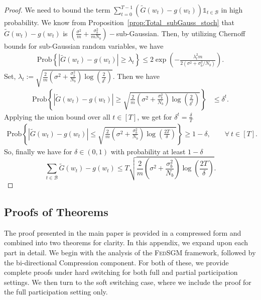 \documentclass{article} %
\def\B{{\mathcal B}}
\begin{document}
\begin{proof}
    We need to bound the term $\sum_{t=0}^{T-1}(\tilde{G}(w_t) - g(w_t))\mathds{1}_{t \in \B}$ in high probability. We know from Proposition~\ref{prop:Total_subGauss_stoch} that $\tilde{G}(w_t) - g(w_t)$ is $\left(\frac{\sigma^2}{m} + \frac{\sigma^2_b}{mN_b}\right)-$sub-Gaussian. Then, by utilizing Chernoff bounds for sub-Gaussian random variables, we have
    \begin{align*}
        \text{Prob}\left\{|\tilde{G}(w_t) - g(w_t)| \geq \lambda_t \right\} \leq 2\exp\left(-\frac{\lambda_t^2m}{2(\sigma^2 + \sigma^2_b/N_b)}\right).
    \end{align*}
    Set, $\lambda_t := \sqrt{\frac{2}{m}(\sigma^2+\frac{\sigma^2_b}{N_b})\log\left(\frac{2}{\delta^t}\right)}$. Then we have
    \begin{align*}
        \text{Prob}\left\{| \tilde{G}(w_t) - g(w_t)| \ge 
             \sqrt{\frac{2}{m} (\sigma^2+\frac{\sigma^2_b}{N_b}) \log\left(\frac{2}{\delta^t}\right)} \right\}
        &\le \delta^t.
    \end{align*}
    Applying the union bound over all $t \in [T]$, we get for $\delta^t = \frac{\delta}{T}$
    \begin{align*}
        \text{Prob}\left\{
            |\tilde{G}(w_t) - g(w_t)| \le
             \sqrt{\frac{2}{m}(\sigma^2+\frac{\sigma^2_b}{N_b}) \log\left(\frac{2T}{\delta}\right)} \right\}
            \ge 1 - \delta, \qquad \forall \ t \in [T].
    \end{align*}
    So, finally we have for $\delta \in (0,1)$ with probability at least $1-\delta$
    $$\sum_{t \in \B}\tilde{G}(w_t) - g(w_t) \le
             T \sqrt{\frac{2}{m} (\sigma^2+\frac{\sigma^2_b}{N_b})\log\left(\frac{2T}{\delta}\right)}.$$
\end{proof}
\subsection{Proofs of Theorems}
The proof presented in the main paper is provided in a compressed form
and combined into two theorems for clarity. In this appendix, we expand
upon each part in detail. We begin with the analysis of the 
\textsc{FedSGM} framework, followed by the bi-directional
Compression component. For both of these, we provide complete proofs
under hard switching for both full and partial participation 
settings. We then turn to the {soft switching} case, where we include the proof for the full participation 
setting only.
\end{document}
